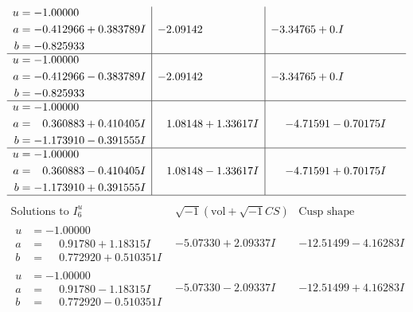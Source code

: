 \documentclass[1p]{elsarticle_modified}
\theoremstyle{definition}
\newcommand{\I}{\sqrt{-1}}
\begin{document}
$$\begin{array}{c|c|c}
\begin{aligned}
u &= -1.00000\phantom{ +0.000000I} \\
a &= -0.412966 + 0.383789 I \\
b &= -0.825933\phantom{ +0.000000I}\end{aligned}
 & -2.09142\phantom{ +0.000000I} & -3.34765 + 0. I\phantom{ +0.000000I} \\ \hline\begin{aligned}
u &= -1.00000\phantom{ +0.000000I} \\
a &= -0.412966 - 0.383789 I \\
b &= -0.825933\phantom{ +0.000000I}\end{aligned}
 & -2.09142\phantom{ +0.000000I} & -3.34765 + 0. I\phantom{ +0.000000I} \\ \hline\begin{aligned}
u &= -1.00000\phantom{ +0.000000I} \\
a &= \phantom{-}0.360883 + 0.410405 I \\
b &= -1.173910 - 0.391555 I\end{aligned}
 & \phantom{-}1.08148 + 1.33617 I & -4.71591 - 0.70175 I \\ \hline\begin{aligned}
u &= -1.00000\phantom{ +0.000000I} \\
a &= \phantom{-}0.360883 - 0.410405 I \\
b &= -1.173910 + 0.391555 I\end{aligned}
 & \phantom{-}1.08148 - 1.33617 I & -4.71591 + 0.70175 I\\
 \hline 
 \end{array}$$\newpage$$\begin{array}{c|c|c}  
\text{Solutions to }I^u_{6}& \I (\text{vol} + \sqrt{-1}CS) & \text{Cusp shape}\\
 \hline 
\begin{aligned}
u &= -1.00000\phantom{ +0.000000I} \\
a &= \phantom{-}0.91780 + 1.18315 I \\
b &= \phantom{-}0.772920 + 0.510351 I\end{aligned}
 & -5.07330 + 2.09337 I & -12.51499 - 4.16283 I \\ \hline\begin{aligned}
u &= -1.00000\phantom{ +0.000000I} \\
a &= \phantom{-}0.91780 - 1.18315 I \\
b &= \phantom{-}0.772920 - 0.510351 I\end{aligned}
 & -5.07330 - 2.09337 I & -12.51499 + 4.16283 I \\ \hline\begin{aligned}

\end{aligned}
\end{array}$$
\end{document}

